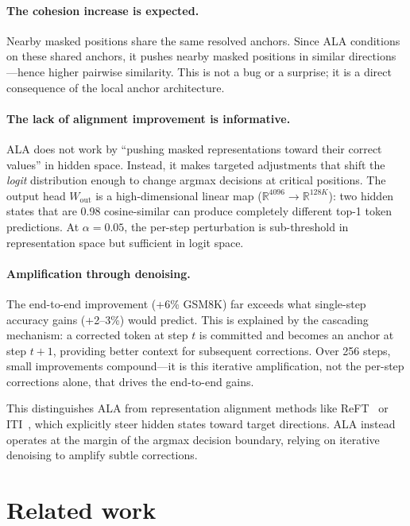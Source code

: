 \documentclass{article} %
\begin{document}
\paragraph{The cohesion increase is expected.}
Nearby masked positions share the same resolved anchors.
Since ALA conditions on these shared anchors, it pushes nearby masked positions in similar directions---hence higher pairwise similarity.
This is not a bug or a surprise; it is a direct consequence of the local anchor architecture.

\paragraph{The lack of alignment improvement is informative.}
ALA does not work by ``pushing masked representations toward their correct values'' in hidden space.
Instead, it makes targeted adjustments that shift the \emph{logit} distribution enough to change argmax decisions at critical positions.
The output head $W_{\text{out}}$ is a high-dimensional linear map ($\mathbb{R}^{4096} \to \mathbb{R}^{128K}$): two hidden states that are 0.98 cosine-similar can produce completely different top-1 token predictions.
At $\alpha{=}0.05$, the per-step perturbation is sub-threshold in representation space but sufficient in logit space.

\paragraph{Amplification through denoising.}
The end-to-end improvement (+6\% GSM8K) far exceeds what single-step accuracy gains (+2--3\%) would predict.
This is explained by the cascading mechanism: a corrected token at step $t$ is committed and becomes an anchor at step $t{+}1$, providing better context for subsequent corrections.
Over 256 steps, small improvements compound---it is this iterative amplification, not the per-step corrections alone, that drives the end-to-end gains.

This distinguishes ALA from representation alignment methods like ReFT~\citep{wu2024reft} or ITI~\citep{li2023iti}, which explicitly steer hidden states toward target directions.
ALA instead operates at the margin of the argmax decision boundary, relying on iterative denoising to amplify subtle corrections.


\section{Related work}
\label{sec:related}
\end{document}
